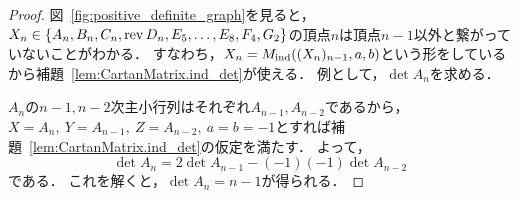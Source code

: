 \begin{proof}
  図~\ref{fig:positive_definite_graph}を見ると，$X_n \in \{A_n, B_n, C_n, \operatorname{rev} D_n, E_5, \ldots, E_8, F_4, G_2\}$の頂点$n$は頂点$n-1$以外と繋がっていないことがわかる．
  すなわち，$X_n = M_{\operatorname{ind}}((X_n)_{n-1}, a, b)$という形をしているから補題~\ref{lem:CartanMatrix.ind_det}が使える．
  例として，$\det A_n$を求める．

  $A_n$の$n-1, n-2$次主小行列はそれぞれ$A_{n-1}, A_{n-2}$であるから，$X = A_n,\ Y = A_{n-1},\ Z = A_{n-2},\ a = b = -1$とすれば補題~\ref{lem:CartanMatrix.ind_det}の仮定を満たす．
  よって，
  \begin{equation}
    \det A_n = 2 \det A_{n-1} - (-1) (-1) \det A_{n-2}
  \end{equation}
  である．
  これを解くと，$\det A_n = n - 1$が得られる．
\end{proof}